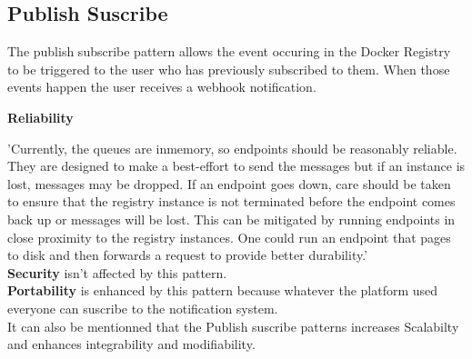\subsection{Publish Suscribe}

The publish subscribe pattern allows the event occuring in the Docker Registry to be triggered to the user who has previously subscribed to them. When those events happen the user receives a webhook notification.

\textbf{Reliability}

'Currently, the queues are inmemory, so endpoints should be reasonably reliable. They are designed to make a best-effort to send the messages but if an instance is lost, messages may be dropped. If an endpoint goes down, care should be taken to ensure that the registry instance is not terminated before the endpoint comes back up or messages will be lost.
This can be mitigated by running endpoints in close proximity to the registry instances. One could run an endpoint that pages to disk and then forwards a request to provide better durability.' \\

\textbf{Security} isn't affected by this pattern.\\
\textbf{Portability} is enhanced by this pattern because whatever the platform used everyone can suscribe to the notification system.\\

It can also be mentionned that the Publish suscribe patterns increases Scalabilty and enhances integrability and modifiability.

